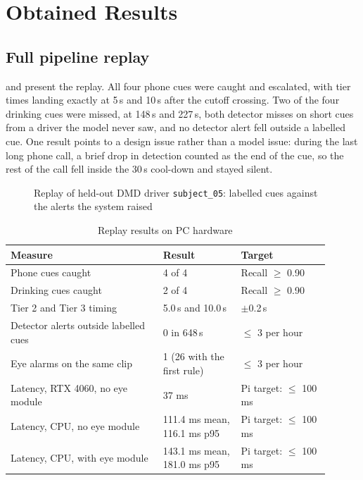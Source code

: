 \section{Obtained Results}
\subsection{Full pipeline replay}

 and  present the replay. All four phone cues were caught and escalated, with tier times landing exactly at 5\,s and 10\,s after the cutoff crossing. Two of the four drinking cues were missed, at 148\,s and 227\,s, both detector misses on short cues from a driver the model never saw, and no detector alert fell outside a labelled cue. One result points to a design issue rather than a model issue: during the last long phone call, a brief drop in detection counted as the end of the cue, so the rest of the call fell inside the 30\,s cool-down and stayed silent.

\begin{figure}[htbp]
\centering

\caption{Replay of held-out DMD driver \texttt{subject\_05}: labelled cues against the alerts the system raised}
\label{fig:replay}
\end{figure}

\begin{table}[htbp]
\centering
\caption{Replay results on PC hardware}
\label{tab:replay}
\footnotesize
\setlength{\tabcolsep}{3pt}
\renewcommand{\arraystretch}{1.15}
\begin{tabular}{|p{0.430\linewidth}|p{0.220\linewidth}|p{0.250\linewidth}|}
\hline
\textbf{Measure} & \textbf{Result} & \textbf{Target} \\
\hline
Phone cues caught & 4 of 4 & Recall $\ge$ 0.90 \\
\hline
Drinking cues caught & 2 of 4 & Recall $\ge$ 0.90 \\
\hline
Tier 2 and Tier 3 timing & 5.0\,s and 10.0\,s & $\pm$0.2\,s \\
\hline
Detector alerts outside labelled cues & 0 in 648\,s & $\le$ 3 per hour \\
\hline
Eye alarms on the same clip & 1 (26 with the first rule) & $\le$ 3 per hour \\
\hline
Latency, RTX 4060, no eye module & 37 ms & Pi target: $\le$ 100 ms \\
\hline
Latency, CPU, no eye module & 111.4 ms mean, 116.1 ms p95 & Pi target: $\le$ 100 ms \\
\hline
Latency, CPU, with eye module & 143.1 ms mean, 181.0 ms p95 & Pi target: $\le$ 100 ms \\
\hline
\end{tabular}
\end{table}

